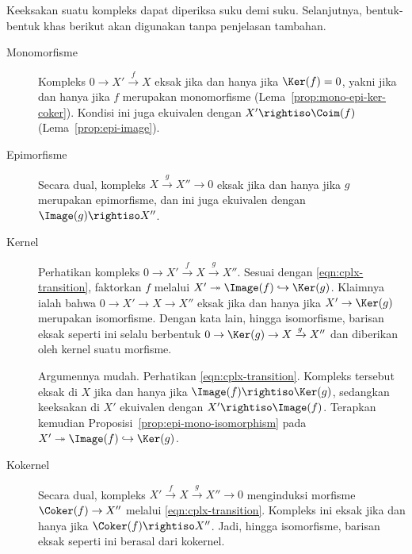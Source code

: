 Keeksakan suatu kompleks dapat diperiksa suku demi suku. Selanjutnya,
bentuk-bentuk khas berikut akan digunakan tanpa penjelasan tambahan.

\begin{description}
	\item[Monomorfisme] Kompleks $0 \to X' \xrightarrow{f} X$ eksak jika dan
	hanya jika $\Ker(f) = 0$, yakni jika dan hanya jika $f$ merupakan
	monomorfisme (Lema~\ref{prop:mono-epi-ker-coker}). Kondisi ini juga ekuivalen
	dengan $X' \rightiso \Coim(f)$ (Lema~\ref{prop:epi-image}).

	\item[Epimorfisme] Secara dual, kompleks
	$X \xrightarrow{g} X'' \to 0$ eksak jika dan hanya jika $g$ merupakan
	epimorfisme, dan ini juga ekuivalen dengan $\Image(g) \rightiso X''$.

	\item[Kernel] Perhatikan kompleks
	$0 \to X' \xrightarrow{f} X \xrightarrow{g} X''$. Sesuai dengan
	\eqref{eqn:cplx-transition}, faktorkan $f$ melalui
	$X' \twoheadrightarrow \Image(f) \hookrightarrow \Ker(g)$. Klaimnya ialah
	bahwa $0 \to X' \to X \to X''$ eksak jika dan hanya jika
	$X' \to \Ker(g)$ merupakan isomorfisme. Dengan kata lain, hingga
	isomorfisme, barisan eksak seperti ini selalu berbentuk
	$0 \to \Ker(g) \to X \xrightarrow{g} X''$ dan diberikan oleh kernel suatu
	morfisme.

	Argumennya mudah. Perhatikan \eqref{eqn:cplx-transition}. Kompleks tersebut
	eksak di $X$ jika dan hanya jika
	$\Image(f) \rightiso \Ker(g)$, sedangkan keeksakan di $X'$ ekuivalen dengan
	$X' \rightiso \Image(f)$. Terapkan kemudian
	Proposisi~\ref{prop:epi-mono-isomorphism} pada
	$X' \twoheadrightarrow \Image(f) \hookrightarrow \Ker(g)$.

	\item[Kokernel] Secara dual, kompleks
	$X' \xrightarrow{f} X \xrightarrow{g} X'' \to 0$ menginduksi morfisme
	$\Coker(f) \to X''$ melalui \eqref{eqn:cplx-transition}. Kompleks ini eksak
	jika dan hanya jika $\Coker(f) \rightiso X''$. Jadi, hingga isomorfisme,
	barisan eksak seperti ini berasal dari kokernel.


\end{description}
